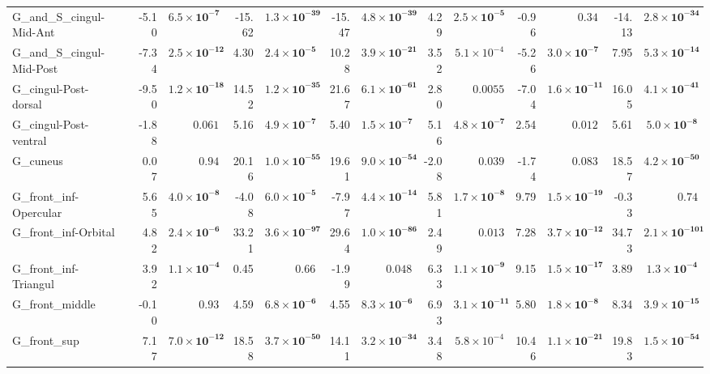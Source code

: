 {\begin{longtable}{llrrrrrrrrrrrr}
G\_and\_S\_cingul-Mid-Ant &  & -5.10 & $\mathbf{6.5{\times}10^{-7}}$ & -15.62 & $\mathbf{1.3{\times}10^{-39}}$ & -15.47 & $\mathbf{4.8{\times}10^{-39}}$ & 4.29 & $\mathbf{2.5{\times}10^{-5}}$ & -0.96 & $0.34$ & -14.13 & $\mathbf{2.8{\times}10^{-34}}$ \\
G\_and\_S\_cingul-Mid-Post &  & -7.34 & $\mathbf{2.5{\times}10^{-12}}$ & 4.30 & $\mathbf{2.4{\times}10^{-5}}$ & 10.28 & $\mathbf{3.9{\times}10^{-21}}$ & 3.52 & $5.1{\times}10^{-4}$ & -5.26 & $\mathbf{3.0{\times}10^{-7}}$ & 7.95 & $\mathbf{5.3{\times}10^{-14}}$ \\
G\_cingul-Post-dorsal &  & -9.50 & $\mathbf{1.2{\times}10^{-18}}$ & 14.52 & $\mathbf{1.2{\times}10^{-35}}$ & 21.67 & $\mathbf{6.1{\times}10^{-61}}$ & 2.80 & $0.0055$ & -7.04 & $\mathbf{1.6{\times}10^{-11}}$ & 16.05 & $\mathbf{4.1{\times}10^{-41}}$ \\
G\_cingul-Post-ventral &  & -1.88 & $0.061$ & 5.16 & $\mathbf{4.9{\times}10^{-7}}$ & 5.40 & $\mathbf{1.5{\times}10^{-7}}$ & 5.16 & $\mathbf{4.8{\times}10^{-7}}$ & 2.54 & $0.012$ & 5.61 & $\mathbf{5.0{\times}10^{-8}}$ \\
G\_cuneus &  & 0.07 & $0.94$ & 20.16 & $\mathbf{1.0{\times}10^{-55}}$ & 19.61 & $\mathbf{9.0{\times}10^{-54}}$ & -2.08 & $0.039$ & -1.74 & $0.083$ & 18.57 & $\mathbf{4.2{\times}10^{-50}}$ \\
G\_front\_inf-Opercular &  & 5.65 & $\mathbf{4.0{\times}10^{-8}}$ & -4.08 & $\mathbf{6.0{\times}10^{-5}}$ & -7.97 & $\mathbf{4.4{\times}10^{-14}}$ & 5.81 & $\mathbf{1.7{\times}10^{-8}}$ & 9.79 & $\mathbf{1.5{\times}10^{-19}}$ & -0.33 & $0.74$ \\
G\_front\_inf-Orbital &  & 4.82 & $\mathbf{2.4{\times}10^{-6}}$ & 33.21 & $\mathbf{3.6{\times}10^{-97}}$ & 29.64 & $\mathbf{1.0{\times}10^{-86}}$ & 2.49 & $0.013$ & 7.28 & $\mathbf{3.7{\times}10^{-12}}$ & 34.73 & $\mathbf{2.1{\times}10^{-101}}$ \\
G\_front\_inf-Triangul &  & 3.92 & $\mathbf{1.1{\times}10^{-4}}$ & 0.45 & $0.66$ & -1.99 & $0.048$ & 6.33 & $\mathbf{1.1{\times}10^{-9}}$ & 9.15 & $\mathbf{1.5{\times}10^{-17}}$ & 3.89 & $\mathbf{1.3{\times}10^{-4}}$ \\
G\_front\_middle &  & -0.10 & $0.93$ & 4.59 & $\mathbf{6.8{\times}10^{-6}}$ & 4.55 & $\mathbf{8.3{\times}10^{-6}}$ & 6.93 & $\mathbf{3.1{\times}10^{-11}}$ & 5.80 & $\mathbf{1.8{\times}10^{-8}}$ & 8.34 & $\mathbf{3.9{\times}10^{-15}}$ \\
G\_front\_sup &  & 7.17 & $\mathbf{7.0{\times}10^{-12}}$ & 18.58 & $\mathbf{3.7{\times}10^{-50}}$ & 14.11 & $\mathbf{3.2{\times}10^{-34}}$ & 3.48 & $5.8{\times}10^{-4}$ & 10.46 & $\mathbf{1.1{\times}10^{-21}}$ & 19.83 & $\mathbf{1.5{\times}10^{-54}}$ \\

\end{longtable}}
